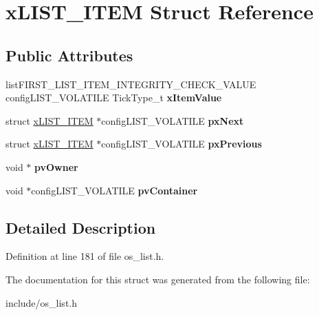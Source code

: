 \hypertarget{structxLIST__ITEM}{}\section{x\+L\+I\+S\+T\+\_\+\+I\+T\+EM Struct Reference}
\label{structxLIST__ITEM}
\subsection*{Public Attributes}
\begin{DoxyCompactItemize}
\item 
\mbox{\label{structxLIST__ITEM_a9b1f26de79f9da1403ca3ebc7a2e653a}} 
list\+F\+I\+R\+S\+T\+\_\+\+L\+I\+S\+T\+\_\+\+I\+T\+E\+M\+\_\+\+I\+N\+T\+E\+G\+R\+I\+T\+Y\+\_\+\+C\+H\+E\+C\+K\+\_\+\+V\+A\+L\+UE config\+L\+I\+S\+T\+\_\+\+V\+O\+L\+A\+T\+I\+LE Tick\+Type\+\_\+t {\bfseries x\+Item\+Value}
\item 
\mbox{\label{structxLIST__ITEM_a03713c4ee953ef5ca6adbec883720c60}} 
struct \mbox{\hyperlink{structxLIST__ITEM}{x\+L\+I\+S\+T\+\_\+\+I\+T\+EM}} $\ast$config\+L\+I\+S\+T\+\_\+\+V\+O\+L\+A\+T\+I\+LE {\bfseries px\+Next}
\item 
\mbox{\label{structxLIST__ITEM_ae8e553eae41010a8e41c66d76c94110b}} 
struct \mbox{\hyperlink{structxLIST__ITEM}{x\+L\+I\+S\+T\+\_\+\+I\+T\+EM}} $\ast$config\+L\+I\+S\+T\+\_\+\+V\+O\+L\+A\+T\+I\+LE {\bfseries px\+Previous}
\item 
\mbox{\label{structxLIST__ITEM_aeb3110b50fe0dbce826d929b27b5ddb1}} 
void $\ast$ {\bfseries pv\+Owner}
\item 
\mbox{\label{structxLIST__ITEM_a341462d06236aa07eaf1a864e4b59951}} 
void $\ast$config\+L\+I\+S\+T\+\_\+\+V\+O\+L\+A\+T\+I\+LE {\bfseries pv\+Container}
\end{DoxyCompactItemize}


\subsection{Detailed Description}


Definition at line 181 of file os\+\_\+list.\+h.



The documentation for this struct was generated from the following file\+:\begin{DoxyCompactItemize}
\item 
include/os\+\_\+list.\+h\end{DoxyCompactItemize}
